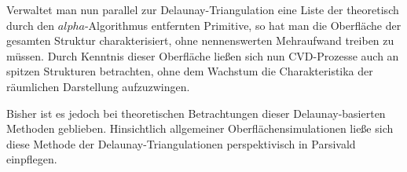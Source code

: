 Verwaltet man nun parallel zur Delaunay-Triangulation eine Liste der theoretisch durch den $alpha$-Algorithmus entfernten Primitive, so hat man die Oberfläche der gesamten Struktur charakterisiert, ohne nennenswerten Mehraufwand treiben zu müssen.
Durch Kenntnis dieser Oberfläche ließen sich nun CVD-Prozesse auch an spitzen Strukturen betrachten, ohne dem Wachstum die Charakteristika der räumlichen Darstellung aufzuzwingen.

Bisher ist es jedoch bei theoretischen Betrachtungen dieser Delaunay-basierten Methoden geblieben.
Hinsichtlich allgemeiner Oberflächensimulationen ließe sich diese Methode der Delaunay-Triangulationen perspektivisch in Parsivald einpflegen.
